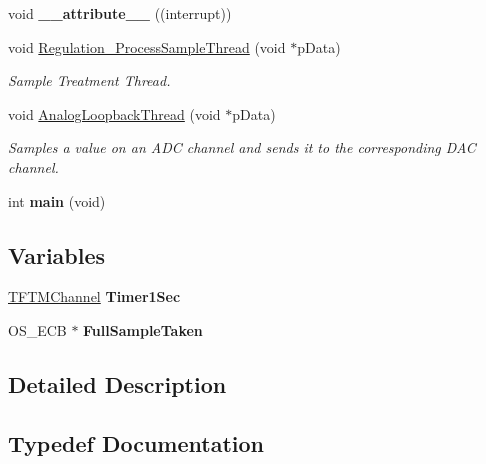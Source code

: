 \begin{DoxyCompactItemize}
\item 
\hypertarget{group__main__module_ga445500277ba0e363873b34cffc015745}{}void {\bfseries \+\_\+\+\_\+attribute\+\_\+\+\_\+} ((interrupt))\label{group__main__module_ga445500277ba0e363873b34cffc015745}

\item 
void \hyperlink{group__main__module_ga3aea5cbfda7d1e940bde7a210faffbcc}{Regulation\+\_\+\+Process\+Sample\+Thread} (void $\ast$p\+Data)
\begin{DoxyCompactList}\small\item\em Sample Treatment Thread. \end{DoxyCompactList}\item 
void \hyperlink{group__main__module_ga57d918b99919e3a8dd4e1b736370015a}{Analog\+Loopback\+Thread} (void $\ast$p\+Data)
\begin{DoxyCompactList}\small\item\em Samples a value on an A\+D\+C channel and sends it to the corresponding D\+A\+C channel. \end{DoxyCompactList}\item 
\hypertarget{group__main__module_ga840291bc02cba5474a4cb46a9b9566fe}{}int {\bfseries main} (void)\label{group__main__module_ga840291bc02cba5474a4cb46a9b9566fe}

\end{DoxyCompactItemize}
\subsection*{Variables}
\begin{DoxyCompactItemize}
\item 
\hypertarget{group__main__module_ga299a41ec770254e51a51bc1cabf58cf6}{}\hyperlink{struct_t_f_t_m_channel}{T\+F\+T\+M\+Channel} {\bfseries Timer1\+Sec}\label{group__main__module_ga299a41ec770254e51a51bc1cabf58cf6}

\item 
\hypertarget{group__main__module_ga65eb073a4239a77c443ed61dcbfb330b}{}O\+S\+\_\+\+E\+C\+B $\ast$ {\bfseries Full\+Sample\+Taken}\label{group__main__module_ga65eb073a4239a77c443ed61dcbfb330b}

\end{DoxyCompactItemize}


\subsection{Detailed Description}


\subsection{Typedef Documentation}
\hypertarget{group__main__module_gae5f40603a116adc42529ceedda6942c7}{}
